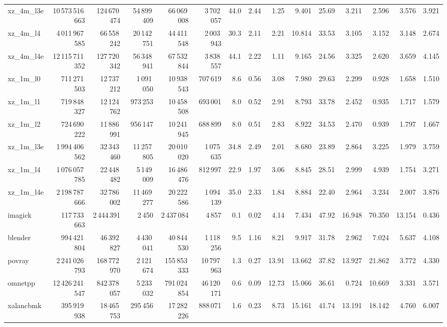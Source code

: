 \documentclass[9pt,landscape,a4paper]{article}
\begin{document}
\begin{adjustbox}{max width=\textwidth, max totalheight=0.50\textheight}
\begin{tabular}{lrrrrrrrrrrrrrr}
xz\_4m\_l3e & 10\,573\,516\,663 & 124\,670\,474 & 54\,899\,409 & 66\,069\,008 & 3\,702\,057 & 44.0 & 2.44 & 1.25 & 9.401 & 25.69 & 3.211 & 2.596 & 3.576 & 3.921 \\
xz\_4m\_l4 & 4\,011\,967\,585 & 66\,558\,242 & 20\,142\,751 & 44\,411\,548 & 2\,003\,943 & 30.3 & 2.11 & 2.21 & 10.814 & 33.53 & 3.105 & 3.152 & 3.148 & 2.674 \\
xz\_4m\_l4e & 12\,115\,711\,352 & 127\,720\,342 & 56\,348\,941 & 67\,532\,844 & 3\,838\,557 & 44.1 & 2.22 & 1.11 & 9.165 & 24.56 & 3.325 & 2.620 & 3.659 & 4.145 \\
xz\_1m\_l0 & 711\,271\,503 & 12\,737\,212 & 1\,091\,050 & 10\,938\,543 & 707\,619 & 8.6 & 0.56 & 3.08 & 7.980 & 29.63 & 2.299 & 0.928 & 1.658 & 1.510 \\
xz\_1m\_l1 & 719\,848\,327 & 12\,124\,762 & 973\,253 & 10\,458\,508 & 693\,001 & 8.0 & 0.52 & 2.91 & 8.793 & 33.78 & 2.452 & 0.935 & 1.717 & 1.579 \\
xz\_1m\_l2 & 724\,690\,222 & 11\,886\,991 & 956\,147 & 10\,241\,945 & 688\,899 & 8.0 & 0.51 & 2.83 & 8.922 & 34.53 & 2.470 & 0.939 & 1.797 & 1.667 \\
xz\_1m\_l3e & 1\,994\,406\,562 & 32\,343\,460 & 11\,257\,805 & 20\,010\,020 & 1\,075\,635 & 34.8 & 2.49 & 2.01 & 8.680 & 23.89 & 2.864 & 3.225 & 1.979 & 3.759 \\
xz\_1m\_l4 & 1\,076\,057\,785 & 22\,448\,482 & 5\,149\,009 & 16\,486\,476 & 812\,997 & 22.9 & 1.97 & 3.06 & 8.845 & 28.51 & 2.999 & 4.939 & 1.754 & 3.271 \\
xz\_1m\_l4e & 2\,198\,787\,666 & 32\,786\,002 & 11\,469\,277 & 20\,222\,586 & 1\,094\,139 & 35.0 & 2.33 & 1.84 & 8.884 & 22.40 & 2.964 & 3.234 & 2.007 & 3.876 \\
imagick & 117\,733\,663 & 2\,444\,391 & 2\,450 & 2\,437\,084 & 4\,857 & 0.1 & 0.02 & 4.14 & 7.434 & 47.92 & 16.948 & 70.350 & 13.154 & 0.436 \\
blender & 994\,421\,804 & 46\,392\,827 & 4\,430\,041 & 40\,844\,530 & 1\,118\,256 & 9.5 & 1.16 & 8.21 & 9.917 & 31.78 & 2.962 & 7.024 & 5.637 & 4.108 \\
povray & 2\,241\,026\,793 & 168\,772\,970 & 2\,121\,674 & 155\,853\,333 & 10\,797\,963 & 1.3 & 0.27 & 13.91 & 13.662 & 37.82 & 13.927 & 21.862 & 3.772 & 4.330 \\
omnetpp & 12\,426\,241\,547 & 842\,378\,057 & 5\,233\,032 & 791\,024\,854 & 46\,120\,171 & 0.6 & 0.09 & 12.73 & 15.066 & 36.61 & 0.724 & 10.669 & 3.331 & 3.571 \\
xalancbmk & 395\,919\,938 & 18\,465\,753 & 295\,456 & 17\,282\,226 & 888\,071 & 1.6 & 0.23 & 8.73 & 15.161 & 41.74 & 13.191 & 18.142 & 4.760 & 6.007 \\

\end{tabular}
\end{adjustbox}
\end{document}
